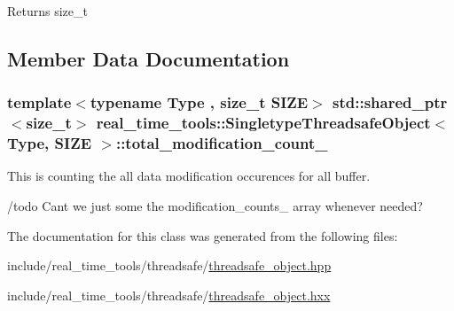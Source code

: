 \begin{DoxyReturn}{Returns}
size\+\_\+t 
\end{DoxyReturn}


\subsection{Member Data Documentation}
\subsubsection[{\texorpdfstring{total\+\_\+modification\+\_\+count\+\_\+}{total_modification_count_}}]{\setlength{\rightskip}{0pt plus 5cm}template$<$typename Type , size\+\_\+t S\+I\+ZE$>$ std\+::shared\+\_\+ptr$<$size\+\_\+t$>$ {\bf real\+\_\+time\+\_\+tools\+::\+Singletype\+Threadsafe\+Object}$<$ Type, S\+I\+ZE $>$\+::total\+\_\+modification\+\_\+count\+\_\+\hspace{0.3cm}{\ttfamily [private]}}\hypertarget{classreal__time__tools_1_1SingletypeThreadsafeObject_a3475e1d35b7af07acdbf74c0170ed45d}{}\label{classreal__time__tools_1_1SingletypeThreadsafeObject_a3475e1d35b7af07acdbf74c0170ed45d}


This is counting the all data modification occurences for all buffer. 

/todo Can\textquotesingle{}t we just some the modification\+\_\+counts\+\_\+ array whenever needed? 

The documentation for this class was generated from the following files\+:\begin{DoxyCompactItemize}
\item 
include/real\+\_\+time\+\_\+tools/threadsafe/\hyperlink{threadsafe__object_8hpp}{threadsafe\+\_\+object.\+hpp}\item 
include/real\+\_\+time\+\_\+tools/threadsafe/\hyperlink{threadsafe__object_8hxx}{threadsafe\+\_\+object.\+hxx}\end{DoxyCompactItemize}
